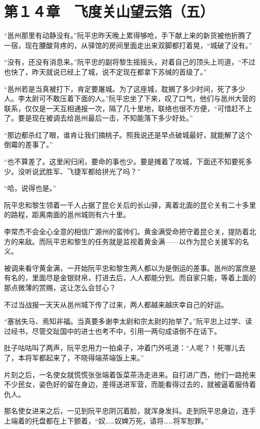 \section{第１４章　飞度关山望云箔（五）}

“邕州那里有动静没有。”阮平忠昨天晚上累得够呛，手下献上来的新货被他折腾了一宿，现在腰酸背疼的，从驿馆的房间里面走出来双脚都打着晃，“城破了没有。”

“没有，还没有消息来。”阮平忠的副将黎生摇摇头，对着自己的顶头上司道，“不过也快了，昨天就说已经上了城，说不定现在都拿下苏缄的首级了。”

“邕州若是当真被打下，肯定要屠城。为了这座城，耽搁了多少时间，死了多少人。李太尉可不敢压着下面的人。”阮平忠坐了下来，叹了口气，他们与邕州大营的联系，仅仅是一天互相通报一次，隔了几十里地，联络也很不方便，“可惜赶不上了。要是现在被调去给邕州最后一击，不知能落下多少好处。”

“那边都杀红了眼，谁肯让我们摘桃子。照我说还是早点破城最好，就能解了这个倒霉的差事了。”

“也不算差了。这里闲归闲，要命的事也少。要是摊着了攻城，下面还不知要死多少。没听说武胜军、飞捷军都给拼光了吗？”

“哈，说得也是。”

阮平忠和黎生领着一千人占据了昆仑关后的长山驿，离着北面的昆仑关有二十多里的路程，距离南面的邕州城则有六十里。

李常杰不会全心全意的相信广源州的蛮帅们。黄金满受命把守着昆仑关，提防着北方的来敌。而阮平忠和黎生的任务就是监视着黄金满——以作为昆仑关援军的名义。

被调来看守黄金满，一开始阮平忠和黎生两人都以为是倒运的差事。邕州的富庶是有名的，里面尽是金银财帛，打进去后，人人都能分到。而自家只能，等着上面的那点微薄的赏赐，这让怎么会甘心？

不过当战报一天天从邕州城下传了过来，两人都越来越庆幸自己的好运。

“塞翁失马、焉知非福。当真要多谢李太尉和宗太尉的抬举了。”阮平忠上过学、读过经书，尽管交趾国中的进士也考不中，引用一两句成语倒不在话下。

肚子咕咕叫了两声，阮平忠用力一拍桌子，冲着门外吼道：“人呢？！死哪儿去了，本将军都起来了，不晓得端茶端饭上来。”

片刻之后，一名使女就慌慌张张端着饭菜茶汤走进来。自打进广西，他们一路抢来不少民女，姿色好的留在身边，差得送进军营，而能看得过去的，就被逼着服侍着仇人。

那名使女进来之后，一见到阮平忠阴沉着脸，就浑身发抖。走到阮平忠身边，连手上端着的托盘都在上下颤着，“奴……奴婢万死，请将……将军恕罪。”

